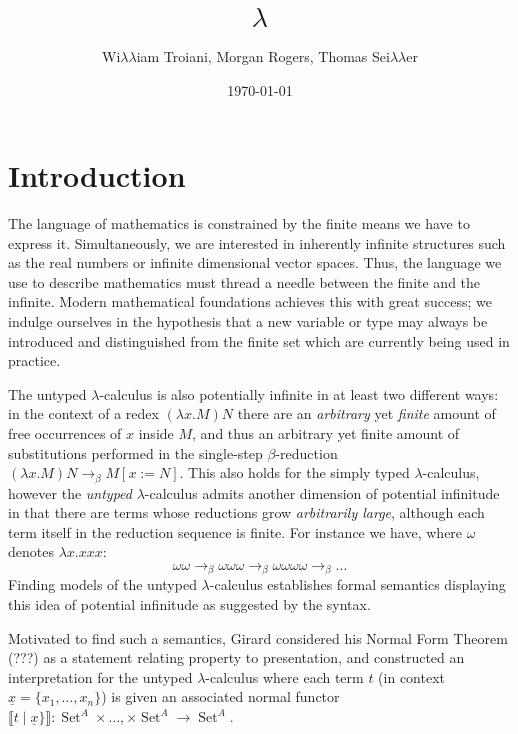 \documentclass[12pt]{article}
\title{$\lambda$}
\author{Wi$\lambda\lambda$iam Troiani, Morgan Rogers, Thomas Sei$\lambda\lambda$er}
\date{\today}
\theoremstyle{plain}
\theoremstyle{definition}
\newcommand{\lto}{\longrightarrow}
\DeclareMathOperator{\set}{Set}
\begin{document}
\maketitle
\tableofcontents
	
\section{Introduction}
The language of mathematics is constrained by the finite means we have to express it. Simultaneously, we are interested in inherently infinite structures such as the real numbers or infinite dimensional vector spaces. Thus, the language we use to describe mathematics must thread a needle between the finite and the infinite. Modern mathematical foundations achieves this with great success; we indulge ourselves in the hypothesis that a new variable or type may always be introduced and distinguished from the finite set which are currently being used in practice.

The untyped $\lambda$-calculus is also potentially infinite in at least two different ways: in the context of a redex $(\lambda x. M)N$ there are an \emph{arbitrary} yet \emph{finite} amount of free occurrences of $x$ inside $M$, and thus an arbitrary yet finite amount of substitutions performed in the single-step $\beta$-reduction $(\lambda x. M)N \lto_{\beta} M[x := N]$. This also holds for the simply typed $\lambda$-calculus, however the \emph{untyped} $\lambda$-calculus admits another dimension of potential infinitude in that there are terms whose reductions grow \emph{arbitrarily large}, although each term itself in the reduction sequence is finite. For instance we have, where $\omega$ denotes $\lambda x. xxx$:
\begin{equation*}
    \omega \omega \lto_{\beta} \omega \omega \omega \lto_{\beta} \omega \omega \omega \omega \lto_{\beta} \ldots
\end{equation*}
Finding models of the untyped $\lambda$-calculus establishes formal semantics displaying this idea of potential infinitude as suggested by the syntax.

Motivated to find such a semantics, Girard considered his Normal Form Theorem (???) as a statement relating property to presentation, and constructed an interpretation for the untyped $\lambda$-calculus where each term $t$ (in context $\underline{x} = \{ x_1, \ldots, x_n \}$) is given an associated normal functor $\llbracket t \mid \underline{x} \} \rrbracket: \set^A \times \ldots, \times \set^A \lto \set^A$.
\end{document}

